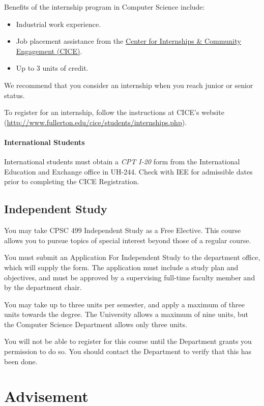 \documentclass{book}
\begin{document}
Benefits of the internship program in Computer Science include:
\begin{itemize}
\item Industrial work experience.
\item Job placement assistance from the \href{http://www.fullerton.edu/cice/students/internships.php}{Center for Internships \& Community Engagement (CICE)}.
\item Up to 3 units of credit.
\end{itemize}

We recommend that you consider an internship when you reach junior or senior status.

To register for an internship, follow the instructions at CICE's website (\url{http://www.fullerton.edu/cice/students/internships.php}).

\subsubsection{International Students}

International students must obtain a \emph{CPT I-20} form from the International Education and Exchange office in UH-244. Check with IEE for admissible dates prior to completing the CICE Registration.

\section{Independent Study}

You may take CPSC 499 Independent Study as a Free Elective. This course allows you to pursue topics of special interest beyond those of a regular course.

You must submit an Application For Independent Study to the department office, which will supply the form. The application must include a study plan and objectives, and must be approved by a supervising full-time faculty member and by the department chair.

You may take up to three units per semester, and apply a maximum of three units towards the degree. The University allows a maximum of nine units, but the Computer Science Department allows only three units.

You will not be able to register for this course until the Department grants you permission to do so. You should contact the Department to verify that this has been done.

\chapter{Advisement}
\end{document}
